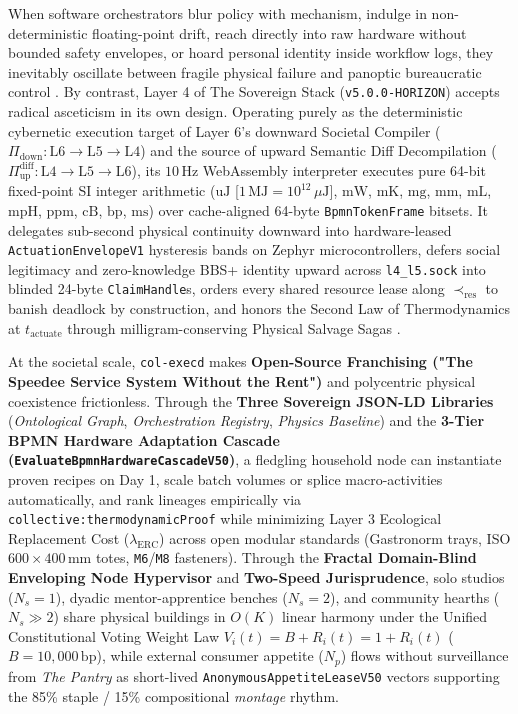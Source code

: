 When software orchestrators blur policy with mechanism, indulge in non-deterministic floating-point drift, reach directly into raw hardware without
bounded safety envelopes, or hoard personal identity inside workflow logs, they inevitably oscillate between fragile physical failure and panoptic
bureaucratic control \parencite{beer1974,saltzer1984end}. By contrast, Layer 4 of The Sovereign Stack (\texttt{v5.0.0-HORIZON}) accepts radical
asceticism in its own design. Operating purely as the deterministic cybernetic execution target of Layer 6's downward Societal Compiler
($\Pi_{\mathrm{down}}: \mathrm{L6} \to \mathrm{L5} \to \mathrm{L4}$) and the source of upward Semantic Diff Decompilation
($\Pi_{\mathrm{up}}^{\mathrm{diff}}: \mathrm{L4} \to \mathrm{L5} \to \mathrm{L6}$), its $10\,\mathrm{Hz}$ WebAssembly interpreter executes pure 64-bit
fixed-point SI integer arithmetic ($\mathrm{uJ}$ [$1\,\mathrm{MJ} = 10^{12}\,\mu\mathrm{J}$], $\mathrm{mW}$, $\mathrm{mK}$, $\mathrm{mg}$, $\mathrm{mm}$,
$\mathrm{mL}$, $\mathrm{mpH}$, $\mathrm{ppm}$, $\mathrm{cB}$, $\mathrm{bp}$, $\mathrm{ms}$) over cache-aligned 64-byte \texttt{BpmnTokenFrame} bitsets.
It delegates sub-second physical continuity downward into hardware-leased \texttt{ActuationEnvelopeV1} hysteresis bands on Zephyr microcontrollers,
defers social legitimacy and zero-knowledge BBS+ identity upward across \texttt{l4\_l5.sock} into blinded 24-byte \texttt{ClaimHandle}s, orders every
shared resource lease along $\prec_{\mathrm{res}}$ to banish deadlock by construction, and honors the Second Law of Thermodynamics at
$t_{\mathrm{actuate}}$ through milligram-conserving Physical Salvage Sagas \parencite{georgescu1971,garciamolina1987sagas}.

At the societal scale, \texttt{col-execd} makes \textbf{Open-Source Franchising ("The Speedee Service System Without the Rent")} and polycentric physical
coexistence frictionless. Through the \textbf{Three Sovereign JSON-LD Libraries} (\textit{Ontological Graph}, \textit{Orchestration Registry},
\textit{Physics Baseline}) and the \textbf{3-Tier BPMN Hardware Adaptation Cascade (\texttt{EvaluateBpmnHardwareCascadeV50})}, a fledgling household node
can instantiate proven recipes on Day 1, scale batch volumes or splice macro-activities automatically, and rank lineages empirically via
\texttt{collective:thermodynamicProof} while minimizing Layer 3 Ecological Replacement Cost ($\lambda_{\mathrm{ERC}}$) across open modular standards
(Gastronorm trays, ISO $600\times 400\,\mathrm{mm}$ totes, \texttt{M6}/\texttt{M8} fasteners). Through the \textbf{Fractal Domain-Blind Enveloping Node
Hypervisor} and \textbf{Two-Speed Jurisprudence}, solo studios ($N_s = 1$), dyadic mentor-apprentice benches ($N_s = 2$), and community hearths
($N_s \gg 2$) share physical buildings in $O(K)$ linear harmony under the Unified Constitutional Voting Weight Law $V_i(t) = B + R_i(t) = 1 + R_i(t)$
($B = 10{,}000\,\mathrm{bp}$), while external consumer appetite ($N_p$) flows without surveillance from \textit{The Pantry} as short-lived
\texttt{AnonymousAppetiteLeaseV50} vectors supporting the 85\% staple / 15\% compositional \textit{montage} rhythm.

